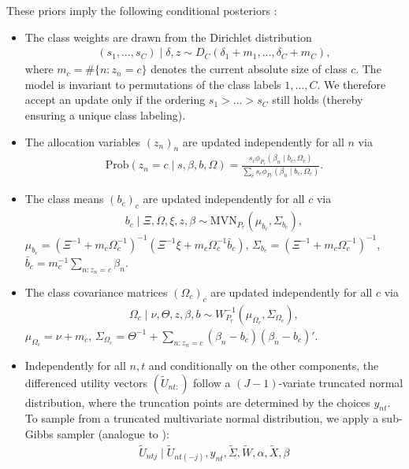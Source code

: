 \documentclass[article,shortnames]{jss}
\begin{document}
These priors imply the following conditional posteriors \citep{Oelschlaeger:2020}:
\begin{itemize}
  \item The class weights are drawn from the Dirichlet distribution
  \begin{align*}
  (s_1,\dots,s_C)\mid \delta,z \sim D_C(\delta_1+m_1,\dots,\delta_C+m_C),
  \end{align*}
  where $m_c=\#\{n:z_n=c\}$ denotes the current absolute size of class $c$. The model is invariant to permutations of the class labels $1,\dots,C$. We therefore accept an update only if the ordering $s_1>\dots>s_C$ still holds (thereby ensuring a unique class labeling).
  \item The allocation variables $(z_n)_n$ are updated independently for all $n$ via
  \begin{align*}
  \text{Prob}(z_n=c\mid s,\beta,b,\Omega )=\frac{s_c\phi_{P_r}(\beta_n\mid b_c,\Omega_c)}{\sum_c s_c\phi_{P_r}(\beta_n\mid b_c,\Omega_c)}.
  \end{align*}
  \item The class means $(b_c)_c$ are updated independently for all $c$ via
  \begin{align*}
  b_c\mid \Xi,\Omega,\xi,z,\beta \sim\text{MVN}_{P_r}\left( \mu_{b_c}, \Sigma_{b_c}  \right),
  \end{align*}
  $\mu_{b_c}=(\Xi^{-1}+m_c\Omega_c^{-1})^{-1}(\Xi^{-1}\xi +m_c\Omega_c^{-1}\bar{b}_c)$, $\Sigma_{b_c}=(\Xi^{-1}+m_c\Omega_c^{-1})^{-1}$, $\bar{b}_c=m_c^{-1}\sum_{n:z_n=c} \beta_n$.
    \item The class covariance matrices $(\Omega_c)_c$ are updated independently for all $c$ via
  \begin{align*}
  \Omega_c \mid \nu,\Theta,z,\beta,b \sim W^{-1}_{P_r}(\mu_{\Omega_c},\Sigma_{\Omega_c}),
  \end{align*}
  $\mu_{\Omega_c}=\nu+m_c$, $\Sigma_{\Omega_c}=\Theta^{-1} + \sum_{n:z_n=c} (\beta_n-b_c)(\beta_n-b_c)'$.
  \item Independently for all $n,t$ and conditionally on the other components, the differenced utility vectors $(\tilde{U}_{nt:})$ follow a $(J-1)$-variate truncated normal distribution, where the truncation points are determined by the choices $y_{nt}$. To sample from a truncated multivariate normal distribution, we apply a sub-Gibbs sampler (analogue to \cite{Geweke:1998}):
  \begin{align*}
  \tilde{U}_{ntj} \mid \tilde{U}_{nt(-j)},y_{nt},\tilde{\Sigma},\tilde{W},\alpha,\tilde{X},\beta

\end{align*}
\end{itemize}
\end{document}
